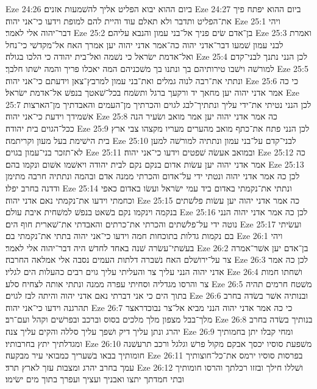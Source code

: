 Eze 24:26  ביום ההוא יבוא הפליט אליך להשׁמעות אזנים׃
Eze 24:27  ביום ההוא יפתח פיך את־הפליט ותדבר ולא תאלם עוד והיית להם למופת וידעו כי־אני יהוה׃
Eze 25:1  ויהי דבר־יהוה אלי לאמר׃
Eze 25:2  בן־אדם שׂים פניך אל־בני עמון והנבא עליהם׃
Eze 25:3  ואמרת לבני עמון שׁמעו דבר־אדני יהוה כה־אמר אדני יהוה יען אמרך האח אל־מקדשׁי כי־נחל ואל־אדמת ישׂראל כי נשׁמה ואל־בית יהודה כי הלכו בגולה׃
Eze 25:4  לכן הנני נתנך לבני־קדם למורשׁה וישׁבו טירותיהם בך ונתנו בך משׁכניהם המה יאכלו פריך והמה ישׁתו חלבך׃
Eze 25:5  ונתתי את־רבה לנוה גמלים ואת־בני עמון למרבץ־צאן וידעתם כי־אני יהוה׃
Eze 25:6  כי כה אמר אדני יהוה יען מחאך יד ורקעך ברגל ותשׂמח בכל־שׁאטך בנפשׁ אל־אדמת ישׂראל׃
Eze 25:7  לכן הנני נטיתי את־ידי עליך ונתתיך־לבג לגוים והכרתיך מן־העמים והאבדתיך מן־הארצות אשׁמידך וידעת כי־אני יהוה׃
Eze 25:8  כה אמר אדני יהוה יען אמר מואב ושׂעיר הנה ככל־הגוים בית יהודה׃
Eze 25:9  לכן הנני פתח את־כתף מואב מהערים מעריו מקצהו צבי ארץ בית הישׁימת בעל מעון וקריתמה׃
Eze 25:10  לבני־קדם על־בני עמון ונתתיה למורשׁה למען לא־תזכר בני־עמון בגוים׃
Eze 25:11  ובמואב אעשׂה שׁפטים וידעו כי־אני יהוה׃
Eze 25:12  כה אמר אדני יהוה יען עשׂות אדום בנקם נקם לבית יהודה ויאשׁמו אשׁום ונקמו בהם׃
Eze 25:13  לכן כה אמר אדני יהוה ונטתי ידי על־אדום והכרתי ממנה אדם ובהמה ונתתיה חרבה מתימן ודדנה בחרב יפלו׃
Eze 25:14  ונתתי את־נקמתי באדום ביד עמי ישׂראל ועשׂו באדום כאפי וכחמתי וידעו את־נקמתי נאם אדני יהוה׃
Eze 25:15  כה אמר אדני יהוה יען עשׂות פלשׁתים בנקמה וינקמו נקם בשׁאט בנפשׁ למשׁחית איבת עולם׃
Eze 25:16  לכן כה אמר אדני יהוה הנני נוטה ידי על־פלשׁתים והכרתי את־כרתים והאבדתי את־שׁארית חוף הים׃
Eze 25:17  ועשׂיתי בם נקמות גדלות בתוכחות חמה וידעו כי־אני יהוה בתתי את־נקמתי בם׃
Eze 26:1  ויהי בעשׁתי־עשׂרה שׁנה באחד לחדשׁ היה דבר־יהוה אלי לאמר׃
Eze 26:2  בן־אדם יען אשׁר־אמרה צר על־ירושׁלם האח נשׁברה דלתות העמים נסבה אלי אמלאה החרבה׃
Eze 26:3  לכן כה אמר אדני יהוה הנני עליך צר והעליתי עליך גוים רבים כהעלות הים לגליו׃
Eze 26:4  ושׁחתו חמות צר והרסו מגדליה וסחיתי עפרה ממנה ונתתי אותה לצחיח סלע׃
Eze 26:5  משׁטח חרמים תהיה בתוך הים כי אני דברתי נאם אדני יהוה והיתה לבז לגוים׃
Eze 26:6  ובנותיה אשׁר בשׂדה בחרב תהרגנה וידעו כי־אני יהוה׃
Eze 26:7  כי כה אמר אדני יהוה הנני מביא אל־צר נבוכדראצר מלך־בבל מצפון מלך מלכים בסוס וברכב ובפרשׁים וקהל ועם־רב׃
Eze 26:8  בנותיך בשׂדה בחרב יהרג ונתן עליך דיק ושׁפך עליך סללה והקים עליך צנה׃
Eze 26:9  ומחי קבלו יתן בחמותיך ומגדלתיך יתץ בחרבותיו׃
Eze 26:10  משׁפעת סוסיו יכסך אבקם מקול פרשׁ וגלגל ורכב תרעשׁנה חומותיך בבאו בשׁעריך כמבואי עיר מבקעה׃
Eze 26:11  בפרסות סוסיו ירמס את־כל־חוצותיך עמך בחרב יהרג ומצבות עזך לארץ תרד׃
Eze 26:12  ושׁללו חילך ובזזו רכלתך והרסו חומותיך ובתי חמדתך יתצו ואבניך ועציך ועפרך בתוך מים ישׂימו׃
